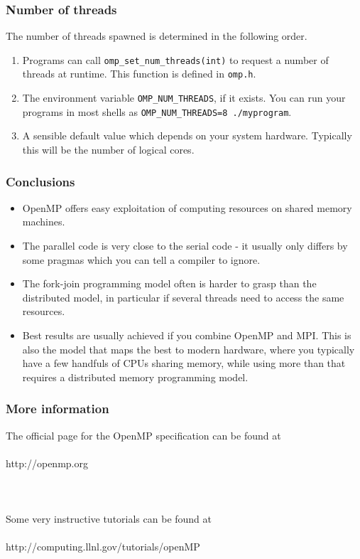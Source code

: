 \begin{frame}[fragile]
  \frametitle{Number of threads}
  The number of threads spawned is determined in the following order.
  \begin{enumerate}
  \item Programs can call \texttt{omp\_set\_num\_threads(int)} to request a number
    of threads at runtime. This function is defined in \texttt{omp.h}.
  \item The environment variable \texttt{OMP\_NUM\_THREADS}, if it exists. You can
    run your programs in most shells as
    \texttt{OMP\_NUM\_THREADS=8 ./myprogram}.
  \item A sensible default value which depends on your system hardware.
    Typically this will be the number of logical cores.
  \end{enumerate}
\end{frame}

\begin{frame}
  \frametitle{Conclusions}
  \begin{itemize}
  \item OpenMP offers easy exploitation of computing resources on shared memory
    machines.
  \item The parallel code is very close to the serial code - it usually only
    differs by some pragmas which you can tell a compiler to ignore.
  \item The fork-join programming model often is harder to grasp than the
    distributed model, in particular if several threads need to access the same
    resources.
  \item Best results are usually achieved if you combine OpenMP and MPI. This is
    also the model that maps the best to modern hardware, where you typically
    have a few handfuls of CPUs sharing memory, while using more than that
    requires a distributed memory programming model.
  \end{itemize}
\end{frame}

\begin{frame}
  \frametitle{More information}
  \begin{center}
    The official page for the OpenMP specification can be found at \\~\\
    http://openmp.org \\~\\~\\~\\
    Some very instructive tutorials can be found at \\~\\
    http://computing.llnl.gov/tutorials/openMP
  \end{center}
\end{frame}


